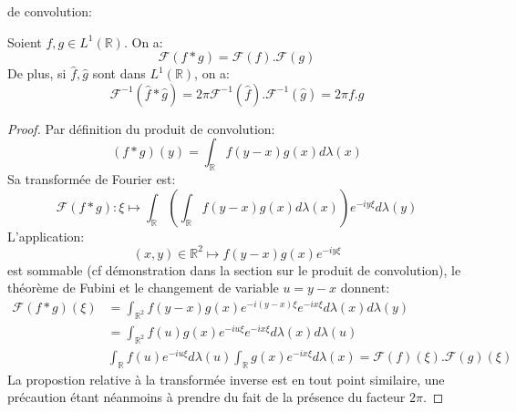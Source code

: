 de convolution:
\begin{mandatory}
\begin{prop}
Soient $f,g \in L^1(\mathbb{R})$. On a:
$$\mathcal{F}(f*g)=\mathcal{F}(f).\mathcal{F}(g)$$
 De plus, si
$\widehat{f},\widehat{g}$ sont dans $L^1(\mathbb{R})$, on a:
$$\mathcal{F}^{-1}(\widehat{f}*\widehat{g})=2 \pi
\mathcal{F}^{-1}(\widehat{f}).\mathcal{F}^{-1}(\widehat{g})=2 \pi f . g$$
\end{prop}
\end{mandatory}
\begin{proof}
Par définition du produit de convolution:
\[
(f*g)(y) = \int_{\mathbb{R}} f(y-x)g(x) d\lambda(x)
\]
Sa transformée de Fourier est:
\[
\mathcal{F}(f*g) \colon \xi \mapsto \int_{\mathbb{R}} \left ( \int_{\mathbb{R}}
f(y-x)g(x) d\lambda(x) \right) e^{-i y \xi} d\lambda(y)
\]
L'application:
\[
(x,y) \in \mathbb{R}^2 \mapsto f(y-x)g(x)e^{-iy \xi}
\]
est sommable (cf démonstration dans la section sur le produit de convolution),
le théorème de Fubini et le changement de variable $u=y-x$ donnent:
\begin{align*}
\mathcal{F}(f*g)(\xi) & = \int_{\mathbb{R}^2}
f(y-x)g(x)   e^{-i (y-x) \xi}e^{-i x \xi} d\lambda(x)d\lambda(y) \\
& = \int_{\mathbb{R}^2}
f(u)g(x)   e^{-i u \xi}e^{-i x \xi} d\lambda(x)d\lambda(u) \\
& \int_{\mathbb{R}}
f(u)   e^{-i u \xi}d\lambda(u)  \int_{\mathbb{R}}g(x) e^{-i x \xi}
d\lambda(x) = \mathcal{F}(f)(\xi).\mathcal{F}(g)(\xi)
\end{align*}
La propostion relative à la transformée inverse est en tout point similaire, une
précaution étant néanmoins à prendre du fait de la présence du facteur $2\pi$.
\end{proof}
